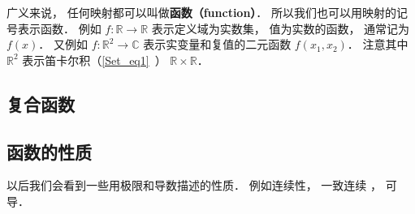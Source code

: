 

\begin{issues}
\issueTODO
\end{issues}

广义来说， 任何映射都可以叫做\textbf{函数（function）}． 所以我们也可以用映射的记号表示函数． 例如 $f: \mathbb R \to \mathbb R$ 表示定义域为实数集， 值为实数的函数， 通常记为 $f(x)$． 又例如 $f: \mathbb R^2 \to \mathbb C$ 表示实变量和复值的二元函数 $f(x_1, x_2)$． 注意其中 $\mathbb R^2$ 表示笛卡尔积（\autoref{Set_eq1}~） $\mathbb R \times \mathbb R$．

\subsection{复合函数}

\subsection{函数的性质}
以后我们会看到一些用极限和导数描述的性质． 例如连续性， 一致连续 %
， 可导．
